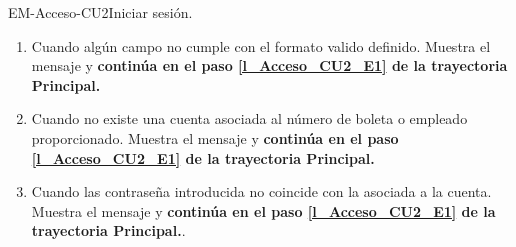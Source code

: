 \begin{UseCase}{EM-Acceso-CU2}{Iniciar sesión.}
{\begin{enumerate}
		       	\item \label{EM-Acceso-CU2-E2} Cuando algún campo no cumple con el formato valido definido. Muestra el mensaje  y \textbf{continúa en el paso \ref{l_Acceso_CU2_E1} de la trayectoria Principal.}

		       	\item \label{EM-Acceso-CU2-E3} Cuando no existe una cuenta asociada al número de boleta o empleado proporcionado. Muestra el mensaje  y \textbf{continúa en el paso \ref{l_Acceso_CU2_E1} de la trayectoria Principal.}

		       	\item \label{EM-Acceso-CU02-E4} Cuando las contraseña introducida no coincide con la asociada a la cuenta. Muestra el mensaje  y \textbf{continúa en el paso \ref{l_Acceso_CU2_E1} de la trayectoria Principal.}.
	       	\end{enumerate}
	    }
	\end{UseCase}
	
